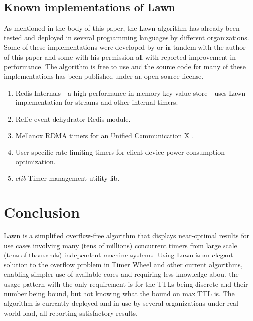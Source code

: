 \documentclass[conference]{IEEEtran}
\begin{document}
\subsection{Known implementations of Lawn}
As mentioned in the body of this paper, the Lawn algorithm has already been tested and deployed in several programming languages by different organizations. Some of these implementations were developed by or in tandem with the author of this paper and some with his permission all with reported improvement in performance. The algorithm is free to use and the source code for many of these implementations has been published under an open source license.
\begin{enumerate}
	\item Redis Internals \cite{Redis} - a high performance in-memory key-value store - uses Lawn implementation for streams and other internal timers.
	\item ReDe event dehydrator Redis module\cite{REDE}.
	\item Mellanox RDMA timers for an Unified Communication X\cite{MLNX} . 
	\item User specific rate limiting-timers for client device power consumption optimization\cite{VUSR}.
	\item $clib$ Timer management utility lib.
\end{enumerate}

\section{Conclusion}
Lawn is a simplified overflow-free algorithm that displays near-optimal results for use cases involving many (tens of millions) concurrent timers from large scale (tens of thousands) independent machine systems.
Using Lawn is an elegant solution to the overflow problem in Timer Wheel and other current algorithms, enabling simpler use of available cores and requiring less knowledge about the usage pattern with the only requirement is for the TTLs being discrete and their number being bound, but not knowing what the bound on max TTL is.
The algorithm is currently deployed and in use by several organizations under real-world load, all reporting satisfactory results.




\end{document}
